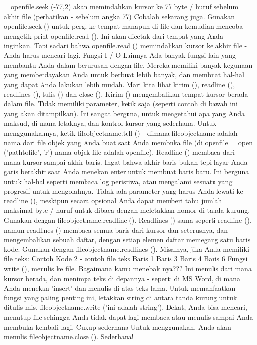  $  $ $  $ $  $ $  $openfile.seek (-77,2) akan memindahkan kursor ke 77 byte / huruf sebelum akhir file (perhatikan - sebelum angka 77) 
Cobalah sekarang juga. Gunakan openfile.seek () untuk pergi ke tempat manapun di file dan kemudian mencoba mengetik print openfile.read (). Ini akan dicetak dari tempat yang Anda inginkan. Tapi sadari bahwa openfile.read () memindahkan kursor ke akhir file - Anda harus mencari lagi.
Fungsi I / O Lainnya 
Ada banyak fungsi lain yang membantu Anda dalam berurusan dengan file. Mereka memiliki banyak kegunaan yang memberdayakan Anda untuk berbuat lebih banyak, dan membuat hal-hal yang dapat Anda lakukan lebih mudah. Mari kita lihat kirim (), readline (), readlines (), tulis () dan close ().
Kirim () mengembalikan tempat kursor berada dalam file. Tidak memiliki parameter, ketik saja (seperti contoh di bawah ini yang akan ditampilkan). Ini sangat berguna, untuk mengetahui apa yang Anda maksud, di mana letaknya, dan kontrol kursor yang sederhana. Untuk menggunakannya, ketik fileobjectname.tell () - dimana fileobjectname adalah nama dari file objek yang Anda buat saat Anda membuka file (di openfile = open ('pathtofile', 'r') nama objek file adalah openfile).
Readline () membaca dari mana kursor sampai akhir baris. Ingat bahwa akhir baris bukan tepi layar Anda - garis berakhir saat Anda menekan enter untuk membuat baris baru. Ini berguna untuk hal-hal seperti membaca log peristiwa, atau mengalami sesuatu yang progresif untuk mengolahnya. Tidak ada parameter yang harus Anda lewati ke readline (), meskipun secara opsional Anda dapat memberi tahu jumlah maksimal byte / huruf untuk dibaca dengan meletakkan nomor di tanda kurung. Gunakan dengan fileobjectname.readline (). 
Readlines () sama seperti readline (), namun readlines () membaca semua baris dari kursor dan seterusnya, dan mengembalikan sebuah daftar, dengan setiap elemen daftar memegang satu baris kode. Gunakan dengan fileobjectname.readlines (). Misalnya, jika Anda memiliki file teks: 
Contoh Kode 2 - contoh file teks 
Baris 1  
Baris 3  
Baris 4  
Baris 6  
Fungsi write (), menulis ke file. Bagaimana kamu menebak nya??? Ini menulis dari mana kursor berada, dan menimpa teks di depannya - seperti di MS Word, di mana Anda menekan 'insert' dan menulis di atas teks lama. Untuk memanfaatkan fungsi yang paling penting ini, letakkan string di antara tanda kurung untuk ditulis mis. fileobjectname.write ('ini adalah string'). 
Dekat, Anda bisa mencari, menutup file sehingga Anda tidak dapat lagi membaca atau menulis sampai Anda membuka kembali lagi. Cukup sederhana Untuk menggunakan, Anda akan menulis fileobjectname.close (). Sederhana! 
